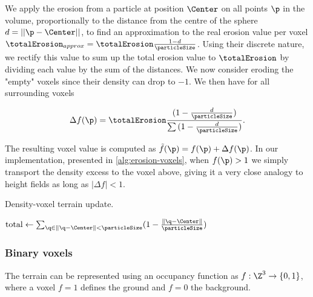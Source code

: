 We apply the erosion from a particle at position $\Center$ on all points $\p$ in the volume, proportionally to the distance from the centre of the sphere $d = ||\p - \Center||$, to find an approximation to the real erosion value per voxel $\totalErosion_{approx} = \totalErosion \frac{1 - d}{\particleSize}$.  
Using their discrete nature, we rectify this value to sum up the total erosion value to $\totalErosion$ by dividing each value by the sum of the distances. We now consider eroding the "empty" voxels since their density can drop to $-1$. We then have for all surrounding voxels 

\begin{align}
    \label{eq:erosion-erosionVoxels}
    \Delta f(\p) = \totalErosion \frac{ (1 - \frac{d}{\particleSize} )}{ \sum {(1 - \frac{d}{\particleSize})}}.
\end{align}

The resulting voxel value is computed as $\Tilde{f}(\p) = f(\p) + \Delta f(\p)$.  
In our implementation, presented in \cref{alg:erosion-voxels}, when $f(\p) > 1$ we simply transport the density excess to the voxel above, giving it a very close analogy to height fields as long as $|\Delta f| < 1$. 

\begin{algorithm}[H]
    \caption{Density-voxel terrain update.}
    \label{alg:erosion-voxels}
    \DontPrintSemicolon
    \BlankLine

    $\text{total} \gets \sum_{\q \in \|\q - \Center\| < \particleSize}(1-\tfrac{\|\q-\Center\|}{\particleSize})$\;
\end{algorithm}


\subsubsection{Binary voxels}
\label{sec:erosion-application_on_binary_voxels}

The terrain can be represented using an occupancy function as $f: \Z^3 \to \{0, 1\}$, where a voxel $f = 1$ defines the ground and $f = 0$ the background. 

